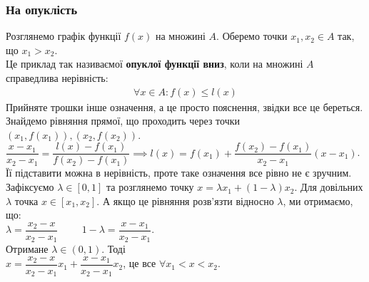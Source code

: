\documentclass[a4paper, 14pt]{article}
\theoremstyle{theoremdd}
\theoremstyle{theoremdd}
\theoremstyle{theoremdd}
\theoremstyle{theoremdd}
\theoremstyle{theoremdd}
\theoremstyle{theoremdd}
\theoremstyle{theoremdd}
\theoremstyle{theoremdd}
\begin{document}
\subsubsection{На опуклість}
Розглянемо графік функції $f(x)$ на множині $A$. Оберемо точки $x_1,x_2 \in A$ так, що $x_1 > x_2$.
\\ %
Це приклад так називаємої \textbf{опуклої функції вниз}, коли на множині $A$ справедлива нерівність:
\begin{align*}
\forall x \in A: f(x) \leq l(x)
\end{align*}
Прийняте трошки інше означення, а це просто пояснення, звідки все це береться.\\
Знайдемо рівняння прямої, що проходить через точки $(x_1,f(x_1)), (x_2,f(x_2))$.\\
$\dfrac{x-x_1}{x_2-x_1} = \dfrac{l(x)-f(x_1)}{f(x_2)-f(x_1)} \implies l(x) = f(x_1) + \dfrac{f(x_2)-f(x_1)}{x_2-x_1}(x-x_1)$.\\
Її підставити можна в нерівність, проте таке означення все рівно не є зручним. Зафіксуємо $\lambda \in [0,1]$ та розглянемо точку $x = \lambda x_1 + (1-\lambda) x_2$. Для довільних $\lambda$ точка $x \in [x_1,x_2]$. А якщо це рівняння розв'язти відносно $\lambda$, ми отримаємо, що:\\
$\lambda = \dfrac{x_2-x}{x_2-x_1} \hspace{1cm} 1-\lambda = \dfrac{x-x_1}{x_2-x_1}$.\\
Отримане $\lambda \in (0,1)$. Тоді\\
$x = \dfrac{x_2-x}{x_2-x_1} x_1 + \dfrac{x-x_1}{x_2-x_1} x_2$, це все $\forall x_1 < x < x_2$.\\
\end{document}
